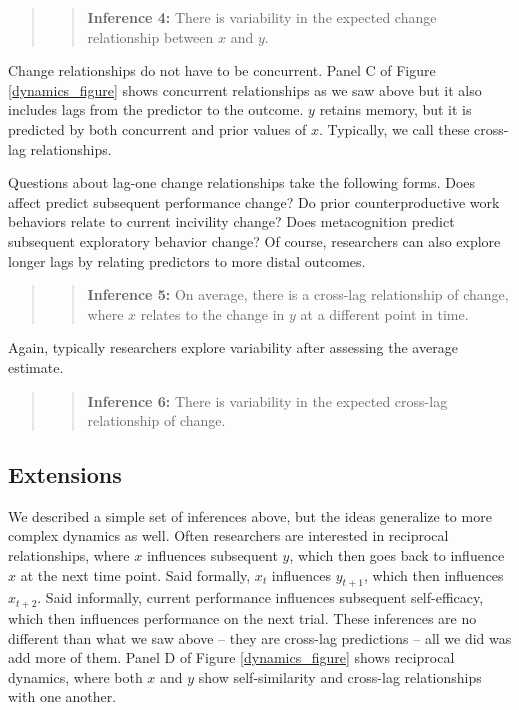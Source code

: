 \documentclass[english,,man]{apa6}
\theoremstyle{definition}
\theoremstyle{definition}
\theoremstyle{definition}
\theoremstyle{remark}
\begin{document}
\begin{quote}
\begin{quote}
\textbf{Inference 4:} There is variability in the expected change
relationship between \(x\) and \(y\).
\end{quote}
\end{quote}

Change relationships do not have to be concurrent. Panel C of Figure
\ref{dynamics_figure} shows concurrent relationships as we saw above but
it also includes lags from the predictor to the outcome. \(y\) retains
memory, but it is predicted by both concurrent and prior values of
\(x\). Typically, we call these cross-lag relationships.

Questions about lag-one change relationships take the following forms.
Does affect predict subsequent performance change? Do prior
counterproductive work behaviors relate to current incivility change?
Does metacognition predict subsequent exploratory behavior change? Of
course, researchers can also explore longer lags by relating predictors
to more distal outcomes.

\begin{quote}
\begin{quote}
\textbf{Inference 5:} On average, there is a cross-lag relationship of
change, where \(x\) relates to the change in \(y\) at a different point
in time.
\end{quote}
\end{quote}

Again, typically researchers explore variability after assessing the
average estimate.

\begin{quote}
\begin{quote}
\textbf{Inference 6:} There is variability in the expected cross-lag
relationship of change.
\end{quote}
\end{quote}

\hypertarget{extensions}{%
\subsection{Extensions}\label{extensions}}

We described a simple set of inferences above, but the ideas generalize
to more complex dynamics as well. Often researchers are interested in
reciprocal relationships, where \(x\) influences subsequent \(y\), which
then goes back to influence \(x\) at the next time point. Said formally,
\(x_t\) influences \(y_{t+1}\), which then influences \(x_{t+2}\). Said
informally, current performance influences subsequent self-efficacy,
which then influences performance on the next trial. These inferences
are no different than what we saw above -- they are cross-lag
predictions -- all we did was add more of them. Panel D of Figure
\ref{dynamics_figure} shows reciprocal dynamics, where both \(x\) and
\(y\) show self-similarity and cross-lag relationships with one another.
\end{document}
